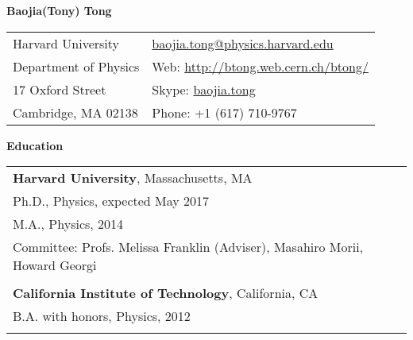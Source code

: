 \documentclass[letterpaper,11pt,oneside]{article}
\newcommand*{\Skype}{\href{skype:baojia.tong?add}{baojia.tong}}
\newcommand{\Absender}[1][\normalsize]{\Skype}
\newcommand{\blue}[1]{\textcolor[rgb]{0,0,0.9}{#1}}
\begin{document}

\noindent  \center \LARGE{\textbf{Baojia(Tony) Tong}}  \\
\vspace{1cm}
\normalsize
\begin{center}
\begin{tabular}{l l}
 Harvard University           & \hspace{1in} \href{mailto:baojia.tong@physics.harvard.edu}{baojia.tong@physics.harvard.edu} \\
 Department of Physics    & \hspace{1in} Web: \blue{\href{http://btong.web.cern.ch/btong/}{http://btong.web.cern.ch/btong/}}   \\
 17 Oxford Street              & \hspace{1in} Skype: \Absender  \\
 Cambridge, MA 02138     & \hspace{1in} Phone: +1 (617) 710-9767 \\
\end{tabular}
\end{center}
\noindent\makebox[\linewidth]{\rule{0.8\paperwidth}{0.4pt}}
\vspace{1cm}
\raggedright
 \textbf{\Large{Education}} \\
 \normalsize
\vspace{-1cm}
\begin{flushleft}
 \begin{tabular}{@{} l}
     \textbf{Harvard University}, Massachusetts, MA \\
     Ph.D., Physics, expected May 2017 \\
     M.A., Physics, 2014 \\
     Committee: Profs. Melissa Franklin (Adviser), Masahiro Morii, Howard Georgi \\
     \\
     \textbf{California Institute of Technology}, California, CA \\
     B.A. with honors, Physics, 2012 \\
     \\
 \end{tabular}
\end{flushleft}
 
\end{document}
